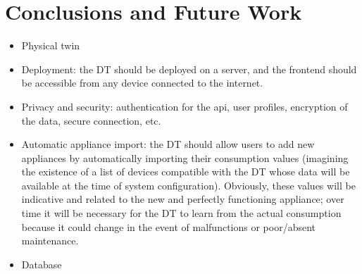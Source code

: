 \chapter{Conclusions and Future Work}\label{ch:conclusions}

\begin{itemize}
    \item Physical twin
    \item Deployment: the DT should be deployed on a server, and the frontend should be accessible from any device connected to the internet.
    \item Privacy and security: authentication for the api, user profiles, encryption of the data, secure connection, etc.
    \item Automatic appliance import: the DT should allow users to add new appliances by automatically importing their consumption values (imagining the existence of a list of devices compatible with the DT whose data will be available at the time of system configuration). Obviously, these values will be indicative and related to the new and perfectly functioning appliance; over time it will be necessary for the DT to learn from the actual consumption because it could change in the event of malfunctions or poor/absent maintenance.
    \item Database
\end{itemize}